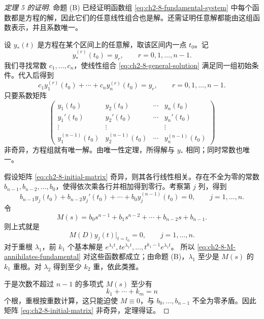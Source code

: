 \begin{proof}[定理 5 的证明]
命题 (B) 已经证明函数组 \eqref{eq:ch2-8-fundamental-system} 中每个函数都是方程的解，因此它们的任意线性组合也是解。还需证明任意解都能由这组函数表示，并且系数唯一。

设 \(y_*(t)\) 是方程在某个区间上的任意解，取该区间内一点 \(t_0\)。记
\[
 y_*^{(r)}(t_0)=y_r,
 \qquad r=0,1,\ldots,n-1.
\]
我们寻找常数 \(c_1,\ldots,c_n\)，使线性组合 \eqref{eq:ch2-8-general-solution} 满足同一组初始条件。代入后得到
\begin{equation}
 c_1y_1^{(r)}(t_0)+\cdots+c_ny_n^{(r)}(t_0)=y_r,
 \qquad r=0,1,\ldots,n-1.
 \label{eq:ch2-8-initial-system}
\end{equation}
只要系数矩阵
\begin{equation}
 \begin{pmatrix}
  y_1(t_0)&y_2(t_0)&\cdots&y_n(t_0)\\
  y_1'(t_0)&y_2'(t_0)&\cdots&y_n'(t_0)\\
  \vdots&\vdots&&\vdots\\
  y_1^{(n-1)}(t_0)&y_2^{(n-1)}(t_0)&\cdots&
  y_n^{(n-1)}(t_0)
 \end{pmatrix}
 \label{eq:ch2-8-initial-matrix}
\end{equation}
非奇异，方程组就有唯一解。由唯一性定理，所得解与 \(y_*\) 相同；同时常数也唯一。

假设矩阵 \eqref{eq:ch2-8-initial-matrix} 奇异，则其各行线性相关。存在不全为零的常数 \(b_{n-1},b_{n-2},\ldots,b_0\)，使得依次乘各行并相加得到零行。考察第 \(j\) 列，得到
\begin{equation}
 b_{n-1}y_j(t_0)+b_{n-2}y_j'(t_0)+\cdots
 +b_0y_j^{(n-1)}(t_0)=0,
 \qquad j=1,\ldots,n.
 \label{eq:ch2-8-matrix-row-relation}
\end{equation}
令
\[
 M(s)=b_0s^{n-1}+b_1s^{n-2}+\cdots+b_{n-2}s+b_{n-1}.
\]
则上式就是
\begin{equation}
 M(D)y_j(t)\big|_{t=t_0}=0,
 \qquad j=1,\ldots,n.
 \label{eq:ch2-8-M-annihilates-fundamental}
\end{equation}
对于重根 \(\lambda_1\)，前 \(k_1\) 个基本解是
\(e^{\lambda_1t},te^{\lambda_1t},\ldots,t^{k_1-1}e^{\lambda_1t}\)。
所以 \eqref{eq:ch2-8-M-annihilates-fundamental} 对这些函数都成立；由命题 (B)，\(\lambda_1\) 至少是 \(M(s)\) 的 \(k_1\) 重根。对 \(\lambda_2\) 得到至少 \(k_2\) 重，依此类推。

于是次数不超过 \(n-1\) 的多项式 \(M(s)\) 至少有
\[
 k_1+\cdots+k_m=n
\]
个根，重根按重数计算，这只能迫使 \(M\equiv0\)，与 \(b_0,\ldots,b_{n-1}\) 不全为零矛盾。因此矩阵 \eqref{eq:ch2-8-initial-matrix} 非奇异，定理得证。
\end{proof}

